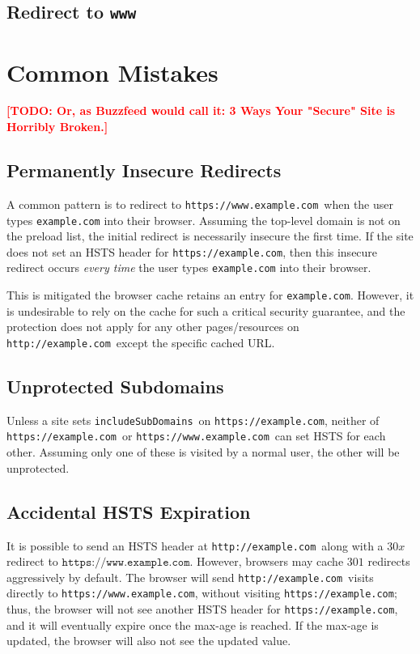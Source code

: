 \documentclass[conference]{./IEEEtran}
\newcommand{\todo}[1]{\textcolor{red}{\textbf{[TODO: #1]}}}
\newcommand{\site}[1]{\texttt{#1}}
\newcommand{\code}[1]{\texttt{#1}}
\newcommand{\iSD}{{\code{includeSubDomains}}}
\newcommand{\genericsite}{example.com}
\newcommand{\h}{{\site{http://\genericsite}}}
\newcommand{\s}{{\site{https://\genericsite}}}
\newcommand{\sw}{{\site{https://www.\genericsite}}}
\theoremstyle{plain}
\begin{document}
\subsection{Redirect to \code{www}}

\section{Common Mistakes}
\todo{Or, as Buzzfeed would call it: 3 Ways Your "Secure" Site is Horribly Broken.}

\subsection{Permanently Insecure Redirects}

A common pattern is to redirect to \sw~when the user types \site{\genericsite} into their browser. Assuming the top-level domain is not on the preload list, the initial redirect is necessarily insecure the first time. If the site does not set an HSTS header for \s, then this insecure redirect occurs \emph{every time} the user types \site{\genericsite} into their browser.

This is mitigated the browser cache retains an entry for \site{\genericsite}. However, it is undesirable to rely on the cache for such a critical security guarantee, and the protection does not apply for any other pages/resources on \h~except the specific cached URL.

\subsection{Unprotected Subdomains}

Unless a site sets \iSD~on \s, neither of \s~or \sw~can set HSTS for each other. Assuming only one of these is visited by a normal user, the other will be unprotected.

\subsection{Accidental HSTS Expiration}

It is possible to send an HSTS header at \h~along with a $30x$ redirect to $\sw$. However, browsers may cache $301$ redirects  aggressively by default. The browser will send \h~visits directly to \sw, without visiting \s; thus, the browser will not see another HSTS header for \s, and it will eventually expire once the max-age is reached. If the max-age is updated, the browser will also not see the updated value.
\end{document}
